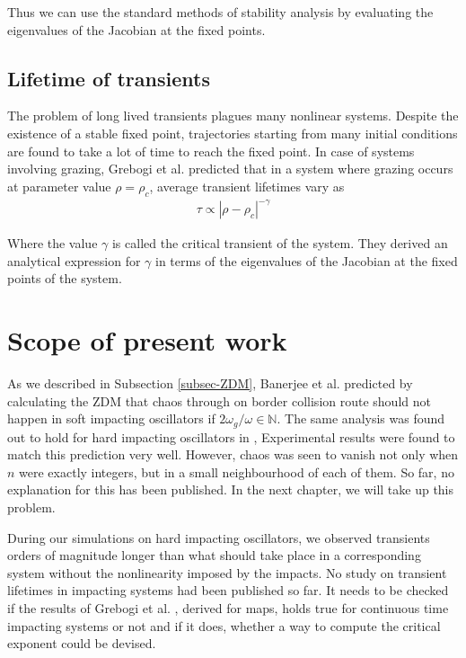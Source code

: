 \documentclass[oneside]{book}
\renewcommand{\(}{\begin{columns}}
\renewcommand{\)}{\end{columns}}
\newcommand{\<}[1]{\begin{column}{#1}}
\renewcommand{\>}{\end{column}}
\begin{document}
Thus we can use the standard methods of stability analysis by evaluating the 
eigenvalues of the Jacobian at the fixed points.  

\subsection{Lifetime of transients}
The problem of long lived transients plagues many nonlinear systems. Despite 
the existence of a stable fixed point, trajectories starting from many initial 
conditions are found to take a lot of time to reach the fixed point.  In case 
of systems involving grazing, Grebogi et al.\cite{grebogi-transient} predicted 
that in a system where grazing occurs at parameter value $\rho=\rho_c$, 
average transient lifetimes vary as
\begin{align}
\label{form-transient-life}
\tau\propto |\rho-\rho_c|^{-\gamma}
\end{align}

Where the value $\gamma$ is called the critical transient of the system.  They 
derived an analytical expression for $\gamma$ in terms of the eigenvalues of 
the Jacobian at the fixed points of the system.  

\section{Scope of present work}
As we described in Subsection \ref{subsec-ZDM}, Banerjee et al. predicted by 
calculating the ZDM that 
chaos through on border collision route should not happen in soft impacting 
oscillators if $2\omega_g/\omega\in\mathbb{N}$.  The same analysis was found out 
to hold for hard impacting oscillators in \cite{banerjee-kundu-hard}, Experimental results were found 
to match this prediction very well. However, chaos was seen to vanish not only when $n$ were exactly 
integers, but in a small neighbourhood of each of them.  So far, no 
explanation for this has been published.  In the next chapter, we will 
take up this problem.  

During our simulations on hard impacting oscillators, we observed transients 
orders of magnitude longer than what should take place in a corresponding system 
without the nonlinearity imposed by the impacts. No study on transient 
lifetimes in impacting systems had been published so far.  It needs to be 
checked if the results of 
Grebogi et al. \cite{grebogi-transient}, derived for maps,  holds true for 
continuous time impacting systems or 
not and if it does, whether a way to compute the critical exponent could be 
devised.  
\end{document}
